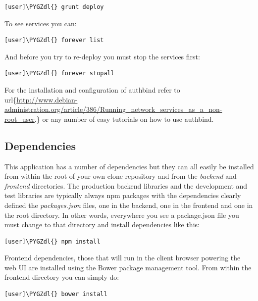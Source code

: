 \documentclass[letterpaper,10pt,english]{sphinxmanual}
\def\PYGZdl{\char`\$}
\begin{document}
\begin{Verbatim}[commandchars=\\\{\}]
[user]\PYGZdl{} grunt deploy
\end{Verbatim}

To see services you can:

\begin{Verbatim}[commandchars=\\\{\}]
[user]\PYGZdl{} forever list
\end{Verbatim}

And before you try to re-deploy you must stop the services first:

\begin{Verbatim}[commandchars=\\\{\}]
[user]\PYGZdl{} forever stopall
\end{Verbatim}

For the installation and configuration of authbind refer to
url\{\href{http://www.debian-administration.org/article/386/Running\_network\_services\_as\_a\_non-root\_user}{http://www.debian-administration.org/article/386/Running\_network\_services\_as\_a\_non-root\_user}.\}
or any number of easy tutorials on how to use authbind.


\subsection{Dependencies}
\label{developer-guide:dependencies}
This application has a number of dependencies but they can all easily
be installed from within the root of your own clone repository and
from the \emph{backend} and \emph{frontend} directories. The production backend
libraries and the development and test libraries are typically always
npm packages with the dependencies clearly defined the \emph{packages.json}
files, one in the backend, one in the frontend and one in the root
directory. In other words, everywhere you see a package.json file you
must change to that directory and install dependencies like this:

\begin{Verbatim}[commandchars=\\\{\}]
[user]\PYGZdl{} npm install
\end{Verbatim}

Frontend dependencies, those that will run in the client browser
powering the web UI are installed using the Bower package management
tool. From within the frontend directory you can simply do:

\begin{Verbatim}[commandchars=\\\{\}]
[user]\PYGZdl{} bower install
\end{Verbatim}
\end{document}
